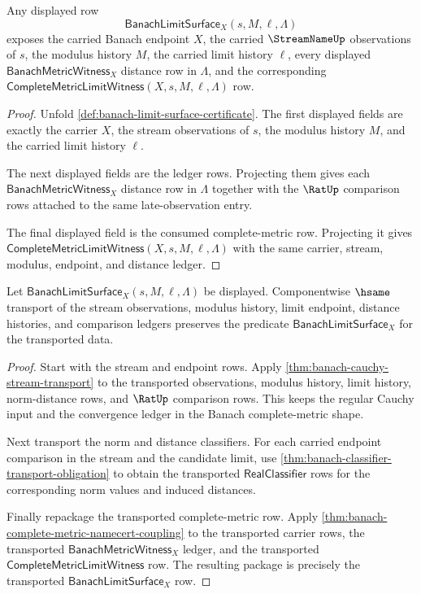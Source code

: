 \begin{theorem}
\label{thm:banach-limit-surface-endpoint-coverage}
Any displayed row
$$
\mathsf{BanachLimitSurface}_X(s,M,\ell,\Lambda)
$$
exposes the carried Banach endpoint $X$, the carried $\StreamNameUp$
observations of $s$, the modulus history $M$, the carried limit history
$\ell$, every displayed $\mathsf{BanachMetricWitness}_X$ distance row in
$\Lambda$, and the corresponding
$\mathsf{CompleteMetricLimitWitness}(X,s,M,\ell,\Lambda)$ row.
\end{theorem}
\begin{proof}
Unfold \autoref{def:banach-limit-surface-certificate}. The first displayed
fields are exactly the carrier $X$, the stream observations of $s$, the
modulus history $M$, and the carried limit history $\ell$.

The next displayed fields are the ledger rows. Projecting them gives each
$\mathsf{BanachMetricWitness}_X$ distance row in $\Lambda$ together with the
$\RatUp$ comparison rows attached to the same late-observation entry.

The final displayed field is the consumed complete-metric row. Projecting it
gives $\mathsf{CompleteMetricLimitWitness}(X,s,M,\ell,\Lambda)$ with the same
carrier, stream, modulus, endpoint, and distance ledger.
\end{proof}

\begin{theorem}
\label{thm:banach-limit-surface-classifier-transport}
Let $\mathsf{BanachLimitSurface}_X(s,M,\ell,\Lambda)$ be displayed.
Componentwise $\hsame$ transport of the stream observations, modulus history,
limit endpoint, distance histories, and comparison ledgers preserves the
predicate $\mathsf{BanachLimitSurface}_X$ for the transported data.
\end{theorem}
\begin{proof}
Start with the stream and endpoint rows. Apply
\autoref{thm:banach-cauchy-stream-transport} to the transported observations,
modulus history, limit history, norm-distance rows, and $\RatUp$ comparison
rows. This keeps the regular Cauchy input and the convergence ledger in the
Banach complete-metric shape.

Next transport the norm and distance classifiers. For each carried endpoint
comparison in the stream and the candidate limit, use
\autoref{thm:banach-classifier-transport-obligation} to obtain the transported
$\mathsf{RealClassifier}$ rows for the corresponding norm values and induced
distances.

Finally repackage the transported complete-metric row. Apply
\autoref{thm:banach-complete-metric-namecert-coupling} to the transported
carrier rows, the transported $\mathsf{BanachMetricWitness}_X$ ledger, and the
transported $\mathsf{CompleteMetricLimitWitness}$ row. The resulting package
is precisely the transported $\mathsf{BanachLimitSurface}_X$ row.
\end{proof}

